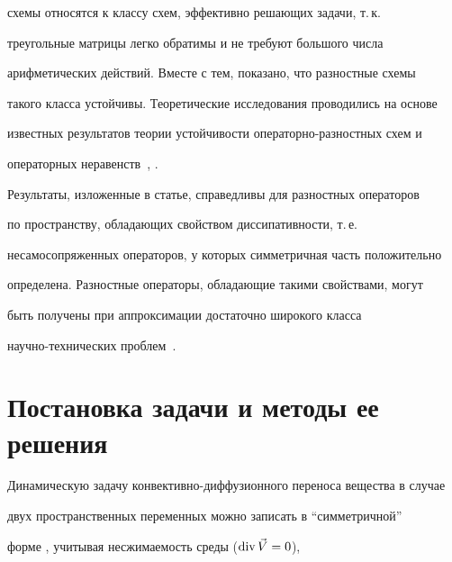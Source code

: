 схемы относятся к классу схем, эффективно решающих задачи, т.\,к. 


треугольные матрицы легко обратимы и не требуют большого числа 


арифметических действий. Вместе с тем, показано, что разностные схемы 


такого класса устойчивы. Теоретические исследования проводились на основе 


известных результатов теории устойчивости операторно-разностных схем и 


операторных неравенств~\cite{subbotinabib6}, \cite{subbotinabib7}. 


Результаты, изложенные в статье, справедливы для разностных операторов 


по пространству, обладающих свойством диссипативности, т.\,е. 


несамосопряженных операторов, у которых симметричная часть положительно 


определена. Разностные операторы, обладающие такими свойствами, могут 


быть получены при аппроксимации достаточно широкого класса 


научно-технических проблем~\cite{subbotinabib8}.





\section{Постановка задачи и методы ее решения}





Динамическую задачу конвективно-диффузионного переноса вещества в случае 


двух пространственных переменных можно записать в ``симметричной''


форме \cite{subbotinabib8}, учитывая несжимаемость среды ($\operatorname{div} \Vec{V}=0$),


